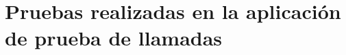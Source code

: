 \chapter{Pruebas realizadas en la aplicación de prueba de llamadas}\label{cap:pruebas_aplicacion_de_pruebas}

